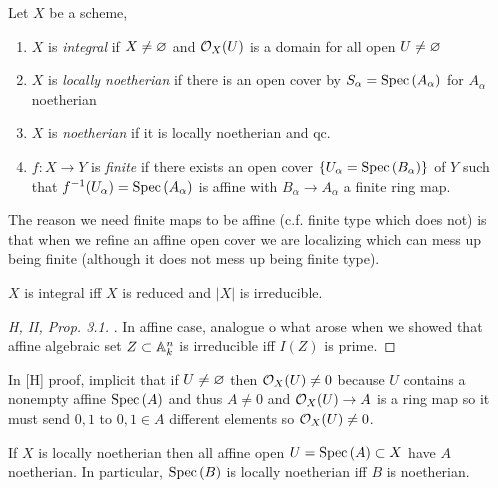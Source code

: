 \documentclass[12pt]{article}
\begin{document}
\begin{defn}
Let $X$ be a scheme,
\begin{enumerate}
\item $X$ is \textit{integral} if $X \neq \varnothing$ and $\mathcal{O}_{X}(U)$ is a domain for all open $U \neq \varnothing$
\item $X$ is \textit{locally noetherian} if there is an open cover by $S_\alpha = \mathrm{Spec}\left( A_\alpha \right)$ for $A_\alpha$ noetherian
\item $X$ is \textit{noetherian} if it is locally noetherian and qc.
\item $f : X \to Y$ is \textit{finite} if there exists an open cover $\{ U_\alpha = \mathrm{Spec}\left( B_\alpha \right) \}$ of $Y$ such that $f^{-1}(U_\alpha) = \mathrm{Spec}\left( A_\alpha \right)$ is affine with $B_\alpha \to A_\alpha$ a finite ring map.
\end{enumerate}
\end{defn}

\begin{rmk}
The reason we need finite maps to be affine (c.f. finite type which does not) is that when we refine an affine open cover we are localizing which can mess up being finite (although it does not mess up being finite type).
\end{rmk}

\begin{thm}
$X$ is integral iff $X$ is reduced and $|X|$ is irreducible.
\end{thm}

\begin{proof}
[H, II, Prop. 3.1]. In affine case, analogue o what arose when we showed that affine algebraic set $Z \subset \mathbb{A}^n_k$ is irreducible iff $I(Z)$ is prime.
\end{proof}

\begin{rmk}
In [H] proof, implicit that if $U \neq \varnothing$ then $\mathcal{O}_{X}(U) \neq 0$ because $U$ contains a nonempty affine $\mathrm{Spec}\left( A \right)$ and thus $A \neq 0$ and $\mathcal{O}_{X}(U) \to A$ is a ring map so it must send $0,1$ to $0,1 \in A$ different elements so $\mathcal{O}_{X}(U) \neq 0$.
\end{rmk}

\begin{thm}
If $X$ is locally noetherian then all affine open $U = \mathrm{Spec}\left( A \right) \subset X$ have $A$ noetherian. In particular, $\mathrm{Spec}\left( B \right)$ is locally noetherian iff $B$ is noetherian.
\end{thm}
\end{document}
